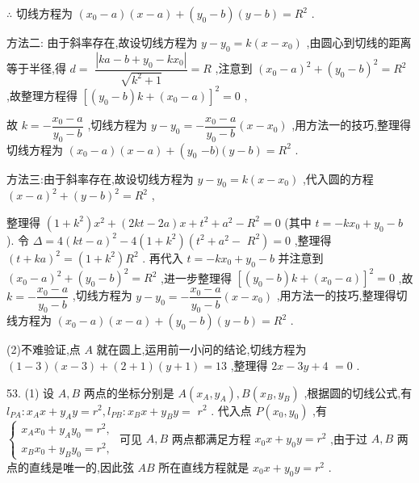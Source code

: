 $\therefore$ 切线方程为 $\left( {{x}_{0} - a}\right) \left( {x - a}\right)  + \left( {{y}_{0} - b}\right) \left( {y - b}\right)  = {R}^{2}$ .

方法二: 由于斜率存在,故设切线方程为 $y - {y}_{0} = k\left( {x - {x}_{0}}\right)$ ,由圆心到切线的距离等于半径,得 $d =$  $\dfrac{\left| ka - b + {y}_{0} - k{x}_{0}\right| }{\sqrt{{k}^{2} + 1}} = R$ ,注意到 ${\left( {x}_{0} - a\right) }^{2} + {\left( {y}_{0} - b\right) }^{2} = {R}^{2}$ ,故整理方程得 ${\left\lbrack  \left( {y}_{0} - b\right) k + \left( {x}_{0} - a\right) \right\rbrack  }^{2} = 0$ ,

故 $k =  - \dfrac{{x}_{0} - a}{{y}_{0} - b}$ ,切线方程为 $y - {y}_{0} =  - \dfrac{{x}_{0} - a}{{y}_{0} - b}\left( {x - {x}_{0}}\right)$ ,用方法一的技巧,整理得切线方程为 $\left( {{x}_{0} - a}\right) \left( {x - a}\right)  + \left( {y}_{0}\right.$  $- b)\left( {y - b}\right)  = {R}^{2}$ .

方法三:由于斜率存在,故设切线方程为 $y - {y}_{0} = k\left( {x - {x}_{0}}\right)$ ,代入圆的方程 ${\left( x - a\right) }^{2} + {\left( y - b\right) }^{2} = {R}^{2}$ ,

整理得 $\left( {1 + {k}^{2}}\right) {x}^{2} + \left( {{2kt} - {2a}}\right) x + {t}^{2} + {a}^{2} - {R}^{2} = 0$ (其中 $t =  - k{x}_{0} + {y}_{0} - b$ ). 令 $\Delta  = 4{\left( kt - a\right) }^{2} - 4\left( {1 + {k}^{2}}\right) \left( {{t}^{2} + {a}^{2} - }\right.$  $\left. {R}^{2}\right)  = 0$ ,整理得 ${\left( t + ka\right) }^{2} = \left( {1 + {k}^{2}}\right) {R}^{2}$ . 再代入 $t =  - k{x}_{0} + {y}_{0} - b$ 并注意到 ${\left( {x}_{0} - a\right) }^{2} + {\left( {y}_{0} - b\right) }^{2} = {R}^{2}$ ,进一步整理得 ${\left\lbrack  \left( {y}_{0} - b\right) k + \left( {x}_{0} - a\right) \right\rbrack  }^{2} = 0$ ,故 $k =  - \dfrac{{x}_{0} - a}{{y}_{0} - b}$ ,切线方程为 $y - {y}_{0} =  - \dfrac{{x}_{0} - a}{{y}_{0} - b}\left( {x - {x}_{0}}\right)$ ,用方法一的技巧,整理得切线方程为 $\left( {{x}_{0} - a}\right) \left( {x - a}\right)  + \left( {{y}_{0} - b}\right) \left( {y - b}\right)  = {R}^{2}$ .

(2)不难验证,点 $A$ 就在圆上,运用前一小问的结论,切线方程为 $\left( {1 - 3}\right) \left( {x - 3}\right)  + \left( {2 + 1}\right) \left( {y + 1}\right)  = {13}$ ,整理得 ${2x} - {3y} + 4$  $= 0$ .

53. (1) 设 $A,B$ 两点的坐标分别是 $A\left( {{x}_{A},{y}_{A}}\right) ,B\left( {{x}_{B},{y}_{B}}\right)$ ,根据圆的切线公式,有 ${l}_{PA} : {x}_{A}x + {y}_{A}y = {r}^{2},{l}_{PB} : {x}_{B}x + {y}_{B}y =$  ${r}^{2}$ . 代入点 $P\left( {{x}_{0},{y}_{0}}\right)$ ,有 $\left\{  \begin{array}{l} {x}_{A}{x}_{0} + {y}_{A}{y}_{0} = {r}^{2}, \\  {x}_{B}{x}_{0} + {y}_{B}{y}_{0} = {r}^{2}, \end{array}\right.$ 可见 $A,B$ 两点都满足方程 ${x}_{0}x + {y}_{0}y = {r}^{2}$ ,由于过 $A,B$ 两点的直线是唯一的,因此弦 ${AB}$ 所在直线方程就是 ${x}_{0}x + {y}_{0}y = {r}^{2}$ .

